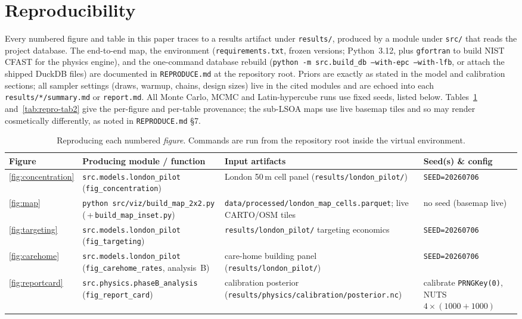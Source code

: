 \section{Reproducibility}
\label{app:repro2}

Every numbered figure and table in this paper traces to a results artifact under
\texttt{results/}, produced by a module under \texttt{src/} that reads the project
database. The end-to-end map, the environment (\texttt{requirements.txt}, frozen
versions; Python~3.12, plus \texttt{gfortran} to build NIST CFAST for the physics
engine), and the one-command database rebuild
(\texttt{python -m src.build\_db --with-epc --with-lfb}, or attach the shipped
DuckDB files) are documented in \texttt{REPRODUCE.md} at the repository root.
Priors are exactly as stated in the model and calibration sections; all sampler
settings (draws, warmup, chains, design sizes) live in the cited modules and are
echoed into each \texttt{results/*/summary.md} or \texttt{report.md}. All Monte
Carlo, MCMC and Latin-hypercube runs use fixed seeds, listed below.
Tables~\ref{tab:repro-fig2} and~\ref{tab:repro-tab2} give the per-figure and
per-table provenance; the sub-LSOA maps use live basemap tiles and so may render
cosmetically differently, as noted in \texttt{REPRODUCE.md} \S7.

\begin{table}[htbp]
  \centering
  \small
  \setlength{\tabcolsep}{4pt}
  \caption{Reproducing each numbered \emph{figure}. Commands are run from the
  repository root inside the virtual environment.}
  \label{tab:repro-fig2}
  \begin{tabular}{@{}p{1.5cm}p{4.5cm}p{4.1cm}p{4.1cm}@{}}
    \toprule
    Figure & Producing module / function & Input artifacts & Seed(s) \& config \\
    \midrule
    \ref{fig:concentration} & \texttt{src.models.london\_pilot}
      (\texttt{fig\_concentration}) & London 50\,m cell panel
      (\texttt{results/london\_pilot/}) & \texttt{SEED=20260706} \\
    \ref{fig:map} & \texttt{python src/viz/build\_map\_2x2.py}
      (\,+\,\texttt{build\_map\_inset.py}) & \texttt{data/processed/london\_map\_cells.parquet};
      live CARTO/OSM tiles & no seed (basemap live) \\
    \ref{fig:targeting} & \texttt{src.models.london\_pilot} (\texttt{fig\_targeting})
      & \texttt{results/london\_pilot/} targeting economics
      & \texttt{SEED=20260706} \\
    \ref{fig:carehome} & \texttt{src.models.london\_pilot}
      (\texttt{fig\_carehome\_rates}, analysis~B) & care-home building panel
      (\texttt{results/london\_pilot/}) & \texttt{SEED=20260706} \\
    \ref{fig:reportcard} & \texttt{src.physics.phaseB\_analysis}
      (\texttt{fig\_report\_card}) & calibration posterior
      (\texttt{results/physics/calibration/posterior.nc})
      & calibrate \texttt{PRNGKey(0)}, NUTS $4\times(1000{+}1000)$ \\
    \bottomrule
  \end{tabular}
\end{table}

